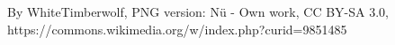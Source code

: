By WhiteTimberwolf, PNG version: Nü - Own work, CC BY-SA 3.0, https://commons.wikimedia.org/w/index.php?curid=9851485